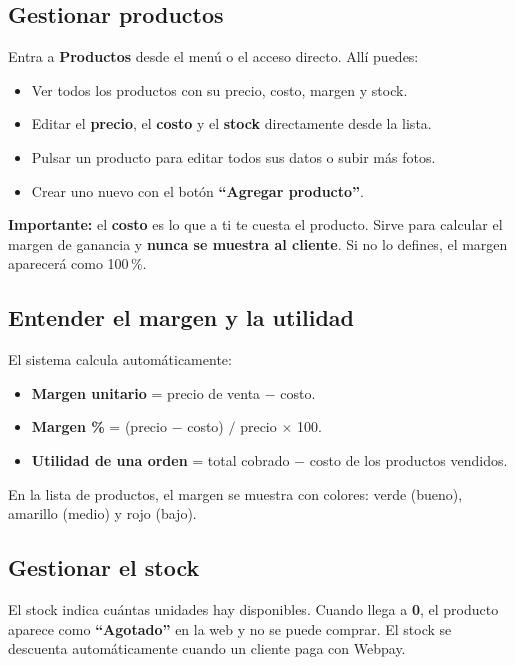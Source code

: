 \documentclass[11pt,a4paper]{article}
\begin{document}
\subsection{Gestionar productos}

Entra a \textbf{Productos} desde el menú o el acceso directo. Allí puedes:
\begin{itemize}[leftmargin=*]
  \item Ver todos los productos con su precio, costo, margen y stock.
  \item Editar el \textbf{precio}, el \textbf{costo} y el \textbf{stock} directamente
        desde la lista.
  \item Pulsar un producto para editar todos sus datos o subir más fotos.
  \item Crear uno nuevo con el botón \textbf{``Agregar producto''}.
\end{itemize}

\begin{nota}
\textbf{Importante:} el \textbf{costo} es lo que a ti te cuesta el producto. Sirve para
calcular el margen de ganancia y \textbf{nunca se muestra al cliente}. Si no lo defines,
el margen aparecerá como 100\,\%.
\end{nota}

\subsection{Entender el margen y la utilidad}

El sistema calcula automáticamente:
\begin{itemize}[leftmargin=*]
  \item \textbf{Margen unitario} = precio de venta $-$ costo.
  \item \textbf{Margen \%} = (precio $-$ costo) $/$ precio $\times$ 100.
  \item \textbf{Utilidad de una orden} = total cobrado $-$ costo de los productos vendidos.
\end{itemize}
En la lista de productos, el margen se muestra con colores: verde (bueno),
amarillo (medio) y rojo (bajo).

\subsection{Gestionar el stock}

El stock indica cuántas unidades hay disponibles. Cuando llega a \textbf{0}, el producto
aparece como \textbf{``Agotado''} en la web y no se puede comprar. El stock se descuenta
automáticamente cuando un cliente paga con Webpay.
\end{document}
